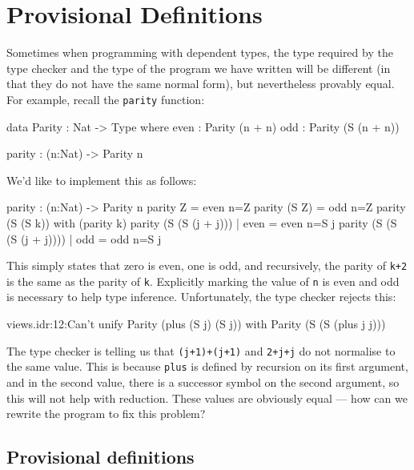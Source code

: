 \section{Provisional Definitions}

\label{sect:provisional}

Sometimes when programming with dependent types, the type required by the type checker and the type of the program we have written will be different (in that they do not have the same normal form), but nevertheless provably equal.
For example, recall the \texttt{parity} function:

\begin{code}
data Parity : Nat -> Type where
   even : Parity (n + n)
   odd  : Parity (S (n + n))

parity : (n:Nat) -> Parity n
\end{code}

\noindent
We'd like to implement this as follows:

\begin{code}
parity : (n:Nat) -> Parity n
parity Z     = even {n=Z}
parity (S Z) = odd {n=Z}
parity (S (S k)) with (parity k)
  parity (S (S (j + j)))     | even = even {n=S j}
  parity (S (S (S (j + j)))) | odd  = odd {n=S j}
\end{code}

\noindent
This simply states that zero is even, one is odd, and recursively, the parity of \texttt{k+2} is the same as the parity of \texttt{k}. 
Explicitly marking the value of \texttt{n} is even and odd is necessary to help type inference.
Unfortunately, the type checker rejects this:

\begin{code}
views.idr:12:Can't unify Parity (plus (S j) (S j)) with 
Parity (S (S (plus j j)))
\end{code}

\noindent
The type checker is telling us that \texttt{(j+1)+(j+1)} and \texttt{2+j+j} do not normalise to the same value.
This is because \texttt{plus} is defined by recursion on its first argument, and in the second value, there is a successor symbol on the second argument, so this will not help with reduction.
These values are obviously equal --- how can we rewrite the program to fix this problem?

\subsection{Provisional definitions}

